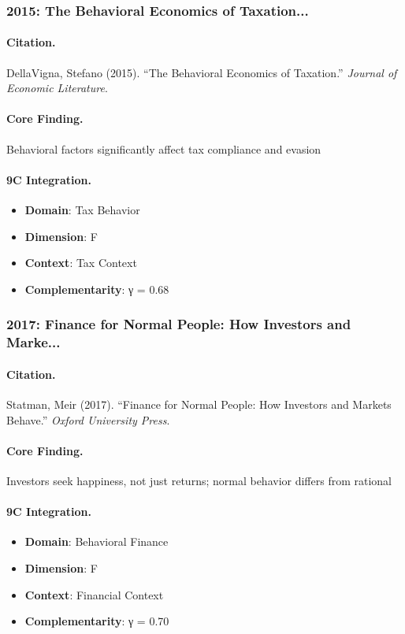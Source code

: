 \subsubsection{2015: The Behavioral Economics of Taxation...}

\paragraph{Citation.}
DellaVigna, Stefano (2015). ``The Behavioral Economics of Taxation.''
\textit{Journal of Economic Literature}.

\paragraph{Core Finding.}
Behavioral factors significantly affect tax compliance and evasion

\paragraph{9C Integration.}
\begin{itemize}[nosep]
  \item \textbf{Domain}: Tax Behavior
  \item \textbf{Dimension}: F
  \item \textbf{Context}: Tax Context
  \item \textbf{Complementarity}: γ = 0.68
\end{itemize}

\subsubsection{2017: Finance for Normal People: How Investors and Marke...}

\paragraph{Citation.}
Statman, Meir (2017). ``Finance for Normal People: How Investors and Markets Behave.''
\textit{Oxford University Press}.

\paragraph{Core Finding.}
Investors seek happiness, not just returns; normal behavior differs from rational

\paragraph{9C Integration.}
\begin{itemize}[nosep]
  \item \textbf{Domain}: Behavioral Finance
  \item \textbf{Dimension}: F
  \item \textbf{Context}: Financial Context
  \item \textbf{Complementarity}: γ = 0.70
\end{itemize}

